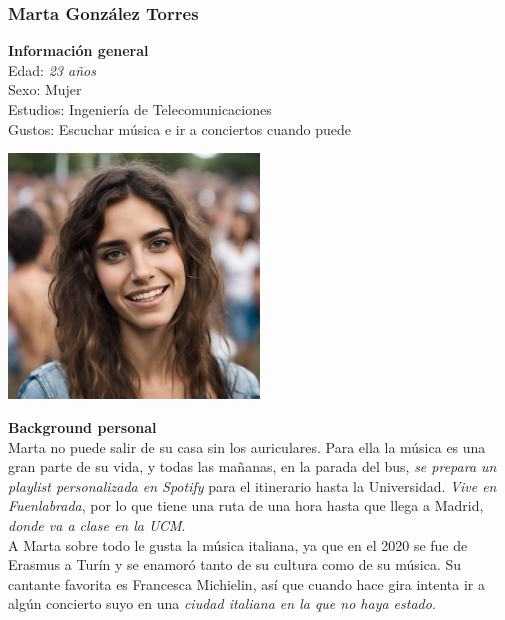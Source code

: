 \subsubsection{Marta González Torres}

\begin{minipage}{0.4\textwidth}
    \textbf{Información general} \\

    Edad: \textit{23 años} \\
    Sexo: Mujer \\
    Estudios: Ingeniería de Telecomunicaciones \\
    Gustos: Escuchar música e ir a conciertos cuando puede \\
\end{minipage}
\hfill
\begin{minipage}{0.4\textwidth}
    \includegraphics[width=0.5\textwidth]{Imagenes/Personas/Marta.jpg}
\end{minipage}

\textbf{Background personal} \\

Marta no puede salir de su casa sin los auriculares. Para ella la música es una gran parte de su vida, y todas las mañanas, en la parada del bus, \textit{se prepara un playlist personalizada en Spotify} para el itinerario hasta la Universidad. \textit{Vive en Fuenlabrada}, por lo que tiene una ruta de una hora hasta que llega a Madrid, \textit{donde va a clase en la UCM}. \\ 

A Marta sobre todo le gusta la música italiana, ya que en el 2020 se fue de Erasmus a Turín y se enamoró tanto de su cultura como de su música. Su cantante favorita es Francesca Michielin, así que cuando hace gira intenta ir a algún concierto suyo en una \textit{ciudad italiana en la que no haya estado}. \\

